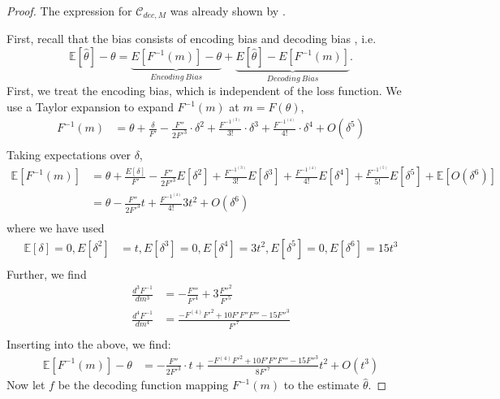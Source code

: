 \begin{proof}
The expression for $\mathcal{C}_{dec,M}$ was already shown by \citet{hahn2024unifying}.


First, recall that the bias consists of encoding bias and decoding bias \citep{hahn2024unifying}, i.e.
\begin{equation*}
    \mathbb{E}[\hat{\theta}] - \theta = \underbrace{E[F^{-1}(m)] - \theta}_{Encoding\ Bias} + \underbrace{E[\hat{\theta}] - E[F^{-1}(m)]}_{Decoding\ Bias}.
\end{equation*}
First, we treat the encoding bias, which is independent of the loss function. We use a Taylor expansion to expand $F^{-1}(m)$ at $m = F(\theta)$,
\begin{align*}
    F^{-1}(m) &= \theta + \frac{\delta}{F'} - \frac{F''}{2F'^3} \cdot \delta^2 + \frac{F^{-1^{(3)}}}{3!} \cdot \delta^3 + \frac{F^{-1^{(4)}}}{4!} \cdot \delta^4 + O(\delta^5)\\
    \end{align*}
    Taking expectations over $\delta$,
    \begin{align*}
\mathbb{E}[F^{-1}(m)] 
    &= \theta + \frac{E[\delta]}{F'} - \frac{F''}{2F'^3}E[\delta^2] + \frac{F^{-1^{(3)}}}{3!}E[\delta^3] + \frac{F^{-1^{(4)}}}{4!}E[\delta^4] + \frac{F^{-1^{(5)}}}{5!}E[\delta^5] + \mathbb{E}[O(\delta^6)]\\
    &= \theta  - \frac{F''}{2F'^3} t + \frac{F^{-1^{(4)}}}{4!} 3t^2 + O(\delta^6)\\
    \end{align*}
    where we have used
    \begin{align*}
\mathbb{E}[\delta] = 0, E[\delta^2] &= t, E[\delta^3] =0, E[\delta^4] = 3t^2, E[\delta^5] = 0, E[\delta^6] = 15t^3\\
    \end{align*}
    Further, we find
    \begin{align*}
    \frac{d^3 F^{-1}}{d m^3} &= -\frac{F'''}{F'^4} + 3\frac{F''^2}{F'^5}\\
    \frac{d^4 F^{-1}}{d m^4} &= \frac{-F^{(4)}F'^2 + 10F'F''F''' - 15F''^3}{F'^7}\\
    \end{align*}
Inserting into the above, we find:
\begin{align}
\label{eq:encoding_bias}
\mathbb{E}[F^{-1}(m)] - \theta &= - \frac{F''}{2F'^3} \cdot t + \frac{-F^{(4)}F'^2 + 10F'F''F''' - 15F''^3}{8F'^7} t^2 + O(t^3)
\end{align}
Now let $f$ be the decoding function mapping $F^{-1}(m)$ to the estimate $\widehat{\theta}$.

\end{proof}
